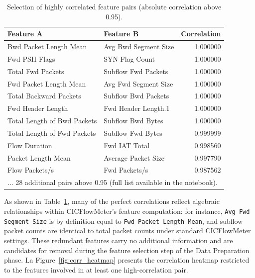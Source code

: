 \documentclass[12pt,a4paper]{article}
\begin{document}
\begin{table}[H]
    \centering
    \caption{Selection of highly correlated feature pairs (absolute correlation above 0.95).}
    \label{tab:high_corr}
    \begin{tabular}{|l|l|r|}
        \hline
        \textbf{Feature A}          & \textbf{Feature B}   & \textbf{Correlation} \\
        \hline
        Bwd Packet Length Mean      & Avg Bwd Segment Size & 1.000000             \\
        \hline
        Fwd PSH Flags               & SYN Flag Count       & 1.000000             \\
        \hline
        Total Fwd Packets           & Subflow Fwd Packets  & 1.000000             \\
        \hline
        Fwd Packet Length Mean      & Avg Fwd Segment Size & 1.000000             \\
        \hline
        Total Backward Packets      & Subflow Bwd Packets  & 1.000000             \\
        \hline
        Fwd Header Length           & Fwd Header Length.1  & 1.000000             \\
        \hline
        Total Length of Bwd Packets & Subflow Bwd Bytes    & 1.000000             \\
        \hline
        Total Length of Fwd Packets & Subflow Fwd Bytes    & 0.999999             \\
        \hline
        Flow Duration               & Fwd IAT Total        & 0.998560             \\
        \hline
        Packet Length Mean          & Average Packet Size  & 0.997790             \\
        \hline
        Flow Packets/s              & Fwd Packets/s        & 0.987562             \\
        \hline
        \multicolumn{3}{|l|}{\small ... 28 additional pairs above 0.95 (full list available
        in the notebook).}                                                        \\
        \hline
    \end{tabular}
\end{table}

As shown in Table~\ref{tab:high_corr}, many of the perfect correlations reflect
algebraic relationships within CICFlowMeter's feature computation: for instance,
\texttt{Avg Fwd Segment Size} is by definition equal to \texttt{Fwd Packet Length Mean},
and subflow packet counts are identical to total packet counts under standard CICFlowMeter
settings. These redundant features carry no additional information and are candidates for
removal during the feature selection step of the Data Preparation phase. La
Figure~\ref{fig:corr_heatmap} presents the correlation heatmap restricted to the
features involved in at least one high-correlation pair.
\end{document}
